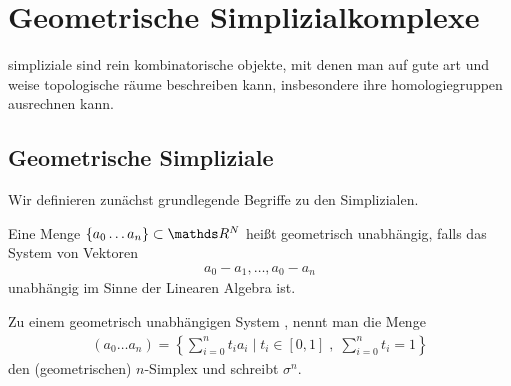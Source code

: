 



\section{Geometrische Simplizialkomplexe}

simpliziale sind rein kombinatorische objekte, mit denen man auf gute
art und weise topologische räume beschreiben kann, insbesondere ihre
homologiegruppen ausrechnen kann.

\subsection{Geometrische Simpliziale}


Wir definieren zunächst grundlegende Begriffe zu den Simplizialen.

\begin{Def}
  Eine Menge $\{ a_0\ldots a_n \} \subset \R^N$ heißt geometrisch
  unabhängig, falls das System von Vektoren
  \begin{gather*}
    a_0 - a_1 , \ldots , a_0 - a_n
  \end{gather*}
  unabhängig im Sinne der Linearen Algebra ist.
\end{Def}


\begin{Def}
  Zu einem geometrisch unabhängigen System \gs, nennt man die Menge
  \begin{gather*}
    (a_0 \ldots a_n) = \left\{ \sum\limits_{i=0}^n t_i a_i \; \Big|
      \; %
      t_i \in [0,1] \; , \; \sum\limits_{i=0}^n t_i = 1 \right\}
  \end{gather*}
  den (geometrischen) $n$-Simplex und schreibt $\sigma^n$.
\end{Def}

